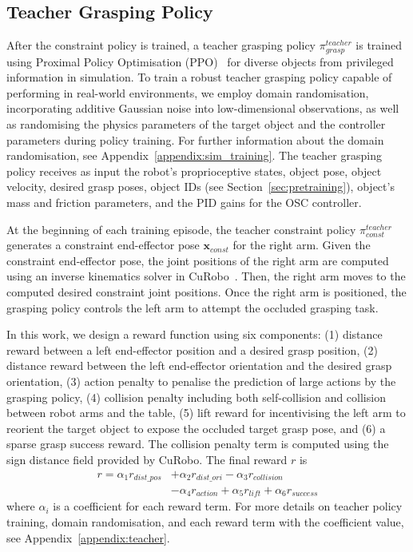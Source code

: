 \subsection{Teacher Grasping Policy}
\label{sec:teacher_training}
After the constraint policy is trained, a teacher grasping policy $\pi^{teacher}_{grasp}$ is trained using Proximal Policy Optimisation (PPO)~\cite{schulman2017proximalpolicyoptimizationalgorithms} for diverse objects from privileged information in simulation.
To train a robust teacher grasping policy capable of performing in real-world environments, we employ domain randomisation, incorporating additive Gaussian noise into low-dimensional observations, as well as randomising the physics parameters of the target object and the controller parameters during policy training. For further information about the domain randomisation, see Appendix~\ref{appendix:sim_training}.
The teacher grasping policy receives as input the robot's proprioceptive states, object pose, object velocity, desired grasp poses, object IDs (see Section~\ref{sec:pretraining}), object's mass and friction parameters, and the PID gains for the OSC controller.

At the beginning of each training episode, the teacher constraint policy $\pi^{teacher}_{const}$ generates a constraint end-effector pose $\mathbf{x}_{const}$ for the right arm.
Given the constraint end-effector pose, the joint positions of the right arm are computed using an inverse kinematics solver in CuRobo~\cite{sundaralingam2023curobo}.
Then, the right arm moves to the computed desired constraint joint positions.
Once the right arm is positioned, the grasping policy controls the left arm to attempt the occluded grasping task.


In this work, we design a reward function using six components: (1) distance reward between a left end-effector position and a desired grasp position, (2) distance reward between the left end-effector orientation and the desired grasp orientation, (3) action penalty to penalise the prediction of large actions by the grasping policy, (4) collision penalty including both self-collision and collision between robot arms and the table, (5) lift reward for incentivising the left arm to reorient the target object to expose the occluded target grasp pose, and (6) a sparse grasp success reward. 
The collision penalty term is computed using the sign distance field provided by CuRobo.
The final reward $r$ is
\begin{equation}
    \begin{split}
    r = \alpha_{1} r_{dist\_pos} &+ 
    \alpha_{2} r_{dist\_ori} - \alpha_{3} r_{collision} \\
    & - \alpha_{4} r_{action} + \alpha_{5} r_{lift} + \alpha_{6} r_{success}        
    \end{split}
\end{equation}
where $\alpha_{i}$ is a coefficient for each reward term.
For more details on teacher policy training, domain randomisation, and each reward term with the coefficient value, see Appendix~\ref{appendix:teacher}.


